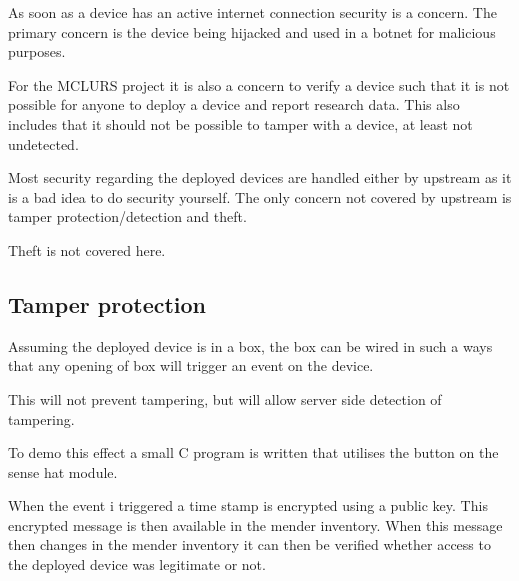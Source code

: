 \documentclass[../../main.tex]{subfiles}
\begin{document}
As soon as a device has an active internet connection security is a concern.
The primary concern is the device being hijacked and used in a botnet for malicious 
purposes.

For the MCLURS project it is also a concern to verify a device such that it is not possible for
anyone to deploy a device and report research data. This also includes that it should not be possible
to tamper with a device, at least not undetected.

Most security regarding the deployed devices are handled either by upstream as it is a bad idea to
do security yourself.
The only concern not covered by upstream is tamper protection/detection and theft.

Theft is not covered here.


%
%
%


\subsection{Tamper protection}%
\label{sub:tamper_protection}

Assuming the deployed device is in a box, the box can be wired in such a ways that any opening of
box will trigger an event on the device.

This will not prevent tampering, but will allow server side detection of tampering.

To demo this effect a small C program is written that utilises the button on the sense hat
module.

When the event i triggered a time stamp is encrypted using a public key.
This encrypted message is then available in the mender inventory.
When this message then changes in the mender inventory it can then be verified
whether access to the deployed device was legitimate or not.
\end{document}
